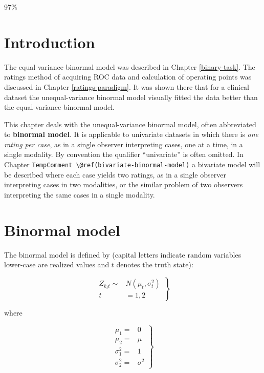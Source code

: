 \documentclass[
]{book}
\begin{document}
97\%

\hypertarget{binormal-model-introduction}{%
\section{Introduction}\label{binormal-model-introduction}}

The equal variance binormal model was described in Chapter \ref{binary-task}. The ratings method of acquiring ROC data and calculation of operating points was discussed in Chapter \ref{ratings-paradigm}. It was shown there that for a clinical dataset the unequal-variance binormal model visually fitted the data better than the equal-variance binormal model.

This chapter deals with the unequal-variance binormal model, often abbreviated to \textbf{binormal model}. It is applicable to univariate datasets in which there is \emph{one rating per case}, as in a single observer interpreting cases, one at a time, in a single modality. By convention the qualifier ``univariate'' is often omitted. In Chapter \texttt{TempComment\ \textbackslash{}@ref(bivariate-binormal-model)} a bivariate model will be described where each case yields two ratings, as in a single observer interpreting cases in two modalities, or the similar problem of two observers interpreting the same cases in a single modality.

\hypertarget{binormal-model-definition}{%
\section{Binormal model}\label{binormal-model-definition}}

The binormal model is defined by (capital letters indicate random variables lower-case are realized values and \(t\) denotes the truth state):

\begin{equation} 
\left.
\begin{aligned}
Z_{k_tt} \sim &N\left ( \mu_t,\sigma_{t}^{2} \right )\\
t&=1,2
\end{aligned}
\right \}
\label{eq:binormal-model-z-samples-1}
\end{equation}

where

\begin{equation} 
\left.
\begin{aligned}
\mu_1=&0\\
\mu_2=&\mu\\
\sigma_{1}^{2}=&1\\
\sigma_{2}^{2}=&\sigma^{2}
\end{aligned}
\right \}
\label{eq:binormal-model-z-samples-2}
\end{equation}
\end{document}
